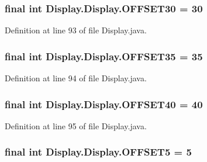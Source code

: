 \subsubsection[{O\+F\+F\+S\+E\+T30}]{\setlength{\rightskip}{0pt plus 5cm}final int Display.\+Display.\+O\+F\+F\+S\+E\+T30 = 30\hspace{0.3cm}{\ttfamily [static]}}\label{class_display_1_1_display_afbede7d7429e2ed899ae713864da8848}


Definition at line 93 of file Display.\+java.

\hypertarget{class_display_1_1_display_a9b88a4d575cdcdcfe550deeac1c147f4}{}
\subsubsection[{O\+F\+F\+S\+E\+T35}]{\setlength{\rightskip}{0pt plus 5cm}final int Display.\+Display.\+O\+F\+F\+S\+E\+T35 = 35\hspace{0.3cm}{\ttfamily [static]}}\label{class_display_1_1_display_a9b88a4d575cdcdcfe550deeac1c147f4}


Definition at line 94 of file Display.\+java.

\hypertarget{class_display_1_1_display_a6c71cd05e79a2e66cac7ac49d8a627b0}{}
\subsubsection[{O\+F\+F\+S\+E\+T40}]{\setlength{\rightskip}{0pt plus 5cm}final int Display.\+Display.\+O\+F\+F\+S\+E\+T40 = 40\hspace{0.3cm}{\ttfamily [static]}}\label{class_display_1_1_display_a6c71cd05e79a2e66cac7ac49d8a627b0}


Definition at line 95 of file Display.\+java.

\hypertarget{class_display_1_1_display_a265426fc52f9fc0f3cf08691bf8fc8bc}{}
\subsubsection[{O\+F\+F\+S\+E\+T5}]{\setlength{\rightskip}{0pt plus 5cm}final int Display.\+Display.\+O\+F\+F\+S\+E\+T5 = 5\hspace{0.3cm}{\ttfamily [static]}}\label{class_display_1_1_display_a265426fc52f9fc0f3cf08691bf8fc8bc}



